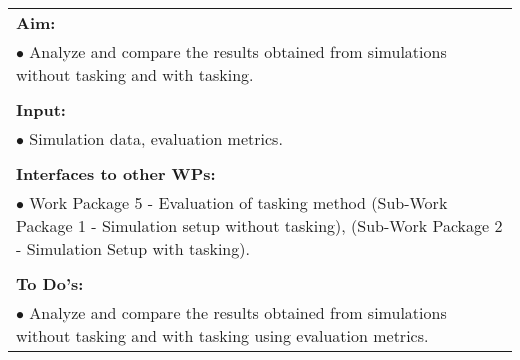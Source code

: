 \begin{table}[!h]
\begin{center}
\begin{tabular}{|p{35mm}||p{55mm}|p{50mm}||p{40mm}|}
      \hline\hline
      \multicolumn{4}{|p{150mm}|}{\textbf{Aim:}}                                                                                                                                                            \\
      \multicolumn{4}{|p{150mm}|}{$\bullet$  Analyze and compare the results obtained from simulations without tasking and with tasking.}                                                   \\
      \multicolumn{4}{|p{150mm}|}{}                                                                                                                                                                           \\
      \multicolumn{4}{|p{150mm}|}{\textbf{Input:}}                                                                                                                                                            \\
      \multicolumn{4}{|p{150mm}|}{$\bullet$ Simulation data, evaluation metrics.}                                                                                                                                 \\
      \multicolumn{4}{|p{150mm}|}{}                                                                                                                                                                           \\
      \multicolumn{4}{|p{150mm}|}{\textbf{Interfaces to other WPs:}}                                                                                                                                 \\
      \multicolumn{4}{|p{150mm}|}{$\bullet$ Work Package 5 - Evaluation of tasking method (Sub-Work Package 1 - Simulation setup without tasking), (Sub-Work Package 2 - Simulation Setup with tasking).  }                                                                                              \\
      \multicolumn{4}{|p{150mm}|}{}                                                                                                                                                                           \\
      \multicolumn{4}{|p{150mm}|}{\textbf{To Do's:}}                                                                                                                                                         \\
      \multicolumn{4}{|p{150mm}|}{$\bullet$ Analyze and compare the results obtained from simulations without tasking and with tasking using evaluation metrics.}\\

\end{tabular}
\end{center}
\end{table}
